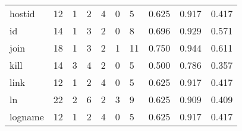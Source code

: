 \begin{longtable}{lp{2.0cm}p{2.0cm}p{2.0cm}p{2.0cm}p{2.0cm}p{2.0cm}p{2.0cm}p{2.0cm}p{2.0cm}}
hostid    &                     12 &                                             1 &                                            2 &                                           4 &                                            0 &                                          5 &                                0.625 &                                  0.917 &                                0.417 \\
id        &                     14 &                                             1 &                                            3 &                                           2 &                                            0 &                                          8 &                                0.696 &                                  0.929 &                                0.571 \\
join      &                     18 &                                             1 &                                            3 &                                           2 &                                            1 &                                         11 &                                0.750 &                                  0.944 &                                0.611 \\
kill      &                     14 &                                             3 &                                            4 &                                           2 &                                            0 &                                          5 &                                0.500 &                                  0.786 &                                0.357 \\
link      &                     12 &                                             1 &                                            2 &                                           4 &                                            0 &                                          5 &                                0.625 &                                  0.917 &                                0.417 \\
ln        &                     22 &                                             2 &                                            6 &                                           2 &                                            3 &                                          9 &                                0.625 &                                  0.909 &                                0.409 \\
logname   &                     12 &                                             1 &                                            2 &                                           4 &                                            0 &                                          5 &                                0.625 &                                  0.917 &                                0.417 \\

\end{longtable}
